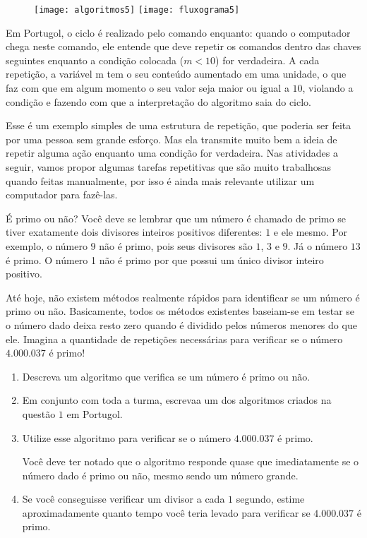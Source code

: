 \begin{figure}[H]
\centering

\texttt{[image: algoritmos5]}
\hspace{1em}
\texttt{[image: fluxograma5]}
\end{figure}

Em Portugol, o ciclo é realizado pelo comando enquanto: quando o computador chega neste comando, ele entende que deve repetir os comandos dentro das chaves seguintes enquanto a condição colocada ($m<10$) for verdadeira. A cada repetição, a variável m tem o seu conteúdo aumentado em uma unidade, o que faz com que em algum momento o seu valor seja maior ou igual a $10$, violando a condição e fazendo com que a interpretação do algoritmo saia do ciclo.

Esse é um exemplo simples de uma estrutura de repetição, que poderia ser feita por uma pessoa sem grande esforço. Mas ela transmite muito bem a ideia de repetir alguma ação enquanto uma condição for verdadeira. Nas atividades a seguir, vamos propor algumas tarefas repetitivas que são muito trabalhosas quando feitas manualmente, por isso é ainda mais relevante utilizar um computador para fazê-las.

\begin{task}{É primo ou não?}
Você deve se lembrar que um número é chamado de primo se tiver exatamente dois divisores inteiros positivos diferentes: $1$ e ele mesmo. Por exemplo, o número $9$ não é primo, pois seus divisores são $1$, $3$ e $9$. Já o número $13$ é primo. O número 1 não é primo por que possui um único divisor inteiro positivo.

Até hoje, não existem métodos realmente rápidos para identificar se um número é primo ou não. Basicamente, todos os métodos existentes baseiam-se em testar se o número dado deixa resto zero quando é dividido pelos números menores do que ele. Imagina a quantidade de repetições necessárias para verificar se o número $4.000.037$ é primo!

\begin{enumerate}
\item Descreva um algoritmo que verifica se um número é primo ou não.

\item Em conjunto com toda a turma, escrevaa um dos algoritmos criados na questão $1$ em Portugol.

\item Utilize esse algoritmo para verificar se o número $4.000.037$ é primo.

Você deve ter notado que o algoritmo responde quase que imediatamente se o número dado é primo ou não, mesmo sendo um número grande.

\item Se você conseguisse verificar um divisor a cada $1$ segundo, estime aproximadamente quanto tempo você teria levado para verificar se $4.000.037$ é primo.
\end{enumerate}

\end{task}

